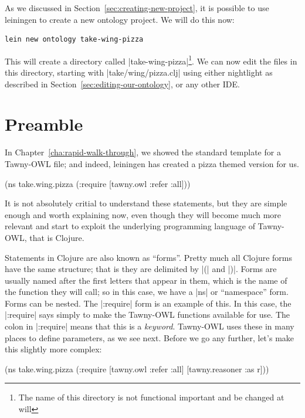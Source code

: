 As we discussed in Section~\ref{sec:creating-new-project}, it is
possible to use leiningen to create a new ontology project. We will do
this now:

\begin{verbatim}
lein new ontology take-wing-pizza
\end{verbatim}

This will create a directory called |take-wing-pizza|\footnote{The
  name of this directory is not functional important and be changed at
will}. We can now edit the files in this directory, starting with
|take/wing/pizza.clj| using either nightlight as described in
Section~\ref{sec:editing-our-ontology}, or any other IDE.


\section{Preamble}
\label{sec:preamble}

In Chapter~\ref{cha:rapid-walk-through}, we showed the standard
template for a Tawny-OWL file; and indeed, leiningen has created a
pizza themed version for us.

\begin{tawnyexample}
(ns take.wing.pizza
  (:require [tawny.owl :refer :all]))
\end{tawnyexample}

It is not absolutely critial to understand these statements, but they
are simple enough and worth explaining now, even though they will
become much more relevant and start to exploit the underlying
programming language of Tawny-OWL, that is Clojure.

Statements in Clojure are also known as ``forms''. Pretty much all
Clojure forms have the same structure; that is they are delimited by
|(| and |)|. Forms are usually named after the first letters that
appear in them, which is the name of the function they will call; so
in this case, we have a |ns| or ``namespace'' form. Forms can be
nested. The |:require| form is an example of this. In this case, the
|:require| says simply to make the Tawny-OWL functions available for
use. The colon in |:require| means that this is a
\emph{keyword}. Tawny-OWL uses these in many places to define
parameters, as we see next. Before we go any further, let's make this
slightly more complex:

\begin{tawny}
(ns take.wing.pizza
  (:require [tawny.owl :refer :all]
            [tawny.reasoner :as r]))
\end{tawny}


